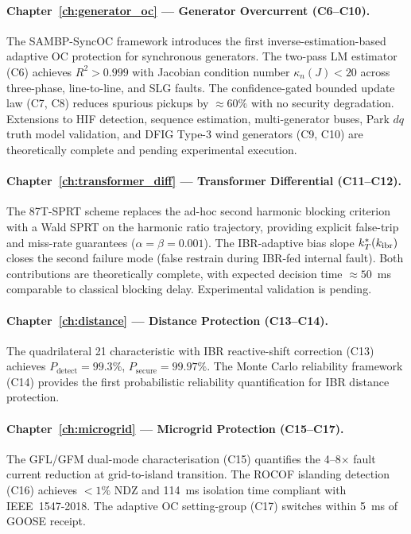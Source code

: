 \paragraph{Chapter~\ref{ch:generator_oc} --- Generator Overcurrent (C6--C10).}
The SAMBP-SyncOC framework introduces the first inverse-estimation-based
adaptive OC protection for synchronous generators. The two-pass LM
estimator (C6) achieves $R^2 > 0.999$ with Jacobian condition number
$\kappa_n(J) < 20$ across three-phase, line-to-line, and SLG faults.
The confidence-gated bounded update law (C7, C8) reduces spurious pickups
by $\approx 60\%$ with no security degradation. Extensions to HIF
detection, sequence estimation, multi-generator buses, Park $dq$ truth
model validation, and DFIG Type-3 wind generators (C9, C10) are
theoretically complete and pending experimental execution.

\paragraph{Chapter~\ref{ch:transformer_diff} --- Transformer Differential (C11--C12).}
The 87T-SPRT scheme replaces the ad-hoc second harmonic blocking criterion
with a Wald SPRT on the harmonic ratio trajectory, providing explicit
false-trip and miss-rate guarantees ($\alpha = \beta = 0.001$). The
IBR-adaptive bias slope $k_T^*(k_\mathrm{ibr})$ closes the second failure mode
(false restrain during IBR-fed internal fault). Both contributions are
theoretically complete, with expected decision time $\approx 50$~ms
comparable to classical blocking delay. Experimental validation is pending.

\paragraph{Chapter~\ref{ch:distance} --- Distance Protection (C13--C14).}
The quadrilateral 21 characteristic with IBR reactive-shift correction (C13)
achieves $P_\mathrm{detect} = 99.3\%$, $P_\mathrm{secure} = 99.97\%$.
The Monte Carlo reliability framework (C14) provides the first probabilistic
reliability quantification for IBR distance protection.

\paragraph{Chapter~\ref{ch:microgrid} --- Microgrid Protection (C15--C17).}
The GFL/GFM dual-mode characterisation (C15) quantifies the 4--8$\times$
fault current reduction at grid-to-island transition. The ROCOF islanding
detection (C16) achieves $< 1\%$ NDZ and 114~ms isolation time compliant
with IEEE~1547-2018. The adaptive OC setting-group (C17) switches within
5~ms of GOOSE receipt.

